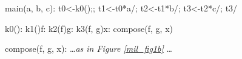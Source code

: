 \begin{minipage}{5in}%
\begin{center}%
\begin{minipage}{4in}%
\begin{AVerb}[numbers=left]
\block main(a, b, c): \label{mil_main_fig2}
  \vbinds t0<-\goto k0();; \label{mil_t0_fig2}
  \vbinds t1<-\app t0*a/; \label{mil_t1_fig2}
  \vbinds t2<-\app t1*b/; \label{mil_t2_fig2}
  \vbinds t3<-\app t2*c/; \label{mil_t3_fig2}
  \return t3/

\block k0(): \mkclo[k1:] \label{mil_k0_fig2}
\ccblock k1()f: \mkclo[k2:f] \label{mil_k1_fig2}
\ccblock k2(f)g: \mkclo[k3:f, g] \label{mil_k2_fig2}
\ccblock k3(f, g)x: \goto compose(f, g, x) \label{mil_k3_fig2}

\block compose(f, g, x): \dots {\rm\emph{as in Figure \ref{mil_fig1b}}} \dots 
\end{AVerb}
\end{minipage}%
\end{center}%
\end{minipage}%
